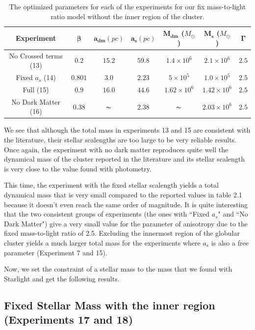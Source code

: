 \begin{table}[H]
\centering
\begin{tabular}{| c| c| c| c| c| c| c|}
    \hline
    \textbf{Experiment} & $\mathbf{\beta}$ & $\mathbf{a_{dm}} (pc)$ & $\mathbf{a_{s}} (pc)$ & $\mathbf{M_{dm}}$ ($M_{\odot}$) & $\mathbf{M_{s}}$ ($M_{\odot}$) & $\mathbf{\Gamma}$\\ \hline
	No Crossed terms (13) & $0.2$ &	$15.2$ &	$59.8$ &	$1.4 \times 10^{6}$ &	$2.1 \times 10^{6}$ &	$2.5$\\ \hline
	Fixed $a_s$ (14) &	$0.801$ &	$3.0$ &	$\mathbf{2.23}$ &	$5 \times 10^{5}$ &	$1.0 \times 10 ^{5}$ &	$2.5$\\ \hline
	Full (15) &	$0.9$ &	$16.0$ &	$44.6$ &	$1.62 \times 10^{6}$ &	$1.42 \times 10^{6}$ &	$2.5$\\ \hline
	No Dark Matter (16) &	$0.38$ &	$\thicksim$ & $ 2.38$ &	$\thicksim$ & $  2.03 \times 10^{6}$ & 	$2.5$\\
    \hline
  \end{tabular} 
\caption[Optimized parameters for our fix mass-to-light ratio model without the inner region.]{The optimized parameters for each of the experiments for our fix mass-to-light ratio model without the inner region of the cluster.}
\end{table} 

We see that although the total mass in experiments 13 and 15 are consistent with the literature, their stellar scalengths are too large to be very reliable results. Once again, the experiment with no dark matter reproduces quite well the dynamical mass of the cluster reported in the literature and its stellar scalength is very close to the value found with photometry. 

This time, the experiment with the fixed stellar scalength yields a total dynamical mass that is very small compared to the reported values in table 2.1 because it doesn't even reach the same order of magnitude. It is quite interesting that the two consistent groups of experiments (the ones with ``Fixed $a_s$" and ``No Dark Matter") give a very small value for the parameter of anisotropy  due to the fixed mass-to-light ratio of 2.5. Excluding the innermost region of the globular cluster yields a much larger total mass for the experiments where $a_s$ is also a free parameter (Experiment 7 and 15).
 
Now, we set the constraint of a stellar mass to the mass that we found with Starlight and get the following results.

\subsection{Fixed Stellar Mass with the inner region (Experiments 17 and 18)}


